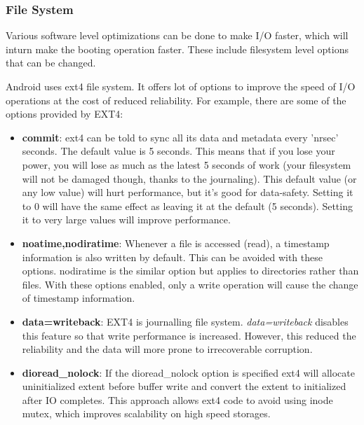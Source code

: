 \subsubsection{File System}

Various software level optimizations can be done to make I/O
faster, which will inturn make the booting operation faster.
These include filesystem level options that can be changed.

Android uses ext4 file system. It offers lot of options to improve
the speed of I/O operations at the cost of reduced reliability.
For example, there are some of the options provided by EXT4:
\begin{itemize}
	\item \textbf{commit}: ext4 can be told to sync all its data and metadata
			every 'nrsec' seconds. The default value is 5 seconds.
			This means that if you lose your power, you will lose
			as much as the latest 5 seconds of work (your
			filesystem will not be damaged though, thanks to the
			journaling).  This default value (or any low value)
			will hurt performance, but it's good for data-safety.
			Setting it to 0 will have the same effect as leaving
			it at the default (5 seconds).
			Setting it to very large values will improve
			performance.

	\item \textbf{noatime,nodiratime}: Whenever a file is accessed (read), a
			timestamp information is also written by default. This can
			be avoided with these options. nodiratime is the similar option
			but applies to directories rather than files. With these options
			enabled, only a write operation will cause the change of timestamp
			information.
	\item \textbf{data=writeback}: EXT4 is journalling file system. \textit{data=writeback}
			disables this feature so that write performance is increased. However,
			this reduced the reliability and the data will more prone to irrecoverable
			corruption.
	\item \textbf{dioread\_nolock}: If the dioread\_nolock option is specified
			ext4 will allocate uninitialized extent before buffer
			write and convert the extent to initialized after IO
			completes. This approach allows ext4 code to avoid
			using inode mutex, which improves scalability on high
			speed storages.	
\end{itemize}

